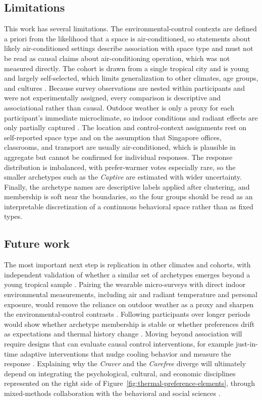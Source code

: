 \documentclass[final,5p,times,twocolumn]{elsarticle}
\begin{document}
\subsection{Limitations}\label{sec:limitations}
This work has several limitations.
The environmental-control contexts are defined a priori from the likelihood that a space is air-conditioned, so statements about likely air-conditioned settings describe association with space type and must not be read as causal claims about air-conditioning operation, which was not measured directly.
The cohort is drawn from a single tropical city and is young and largely self-selected, which limits generalization to other climates, age groups, and cultures \citep{Naheed2021-ce, Karjalainen2012-ag}.
Because survey observations are nested within participants and were not experimentally assigned, every comparison is descriptive and associational rather than causal.
Outdoor weather is only a proxy for each participant's immediate microclimate, so indoor conditions and radiant effects are only partially captured \citep{Halawa2014-ek}.
The location and control-context assignments rest on self-reported space type and on the assumption that Singapore offices, classrooms, and transport are usually air-conditioned, which is plausible in aggregate but cannot be confirmed for individual responses.
The response distribution is imbalanced, with prefer-warmer votes especially rare, so the smaller archetypes such as the \emph{Captive} are estimated with wider uncertainty.
Finally, the archetype names are descriptive labels applied after clustering, and membership is soft near the boundaries, so the four groups should be read as an interpretable discretization of a continuous behavioral space rather than as fixed types.

\subsection{Future work}\label{sec:future-work}
The most important next step is replication in other climates and cohorts, with independent validation of whether a similar set of archetypes emerges beyond a young tropical sample \citep{Naheed2021-ce}.
Pairing the wearable micro-surveys with direct indoor environmental measurements, including air and radiant temperature and personal exposure, would remove the reliance on outdoor weather as a proxy and sharpen the environmental-control contrasts \citep{Halawa2014-ek}.
Following participants over longer periods would show whether archetype membership is stable or whether preferences drift as expectations and thermal history change \citep{Schweiker2020-pw, Dear1998-va}.
Moving beyond association will require designs that can evaluate causal control interventions, for example just-in-time adaptive interventions that nudge cooling behavior and measure the response \citep{Miller2025-sv}.
Explaining why the \emph{Craver} and the \emph{Carefree} diverge will ultimately depend on integrating the psychological, cultural, and economic disciplines represented on the right side of Figure~\ref{fig:thermal-preference-elements}, through mixed-methods collaboration with the behavioral and social sciences \citep{Shove2003-lf, Strengers2011-bm, Gillingham2012-nf}.
\end{document}

